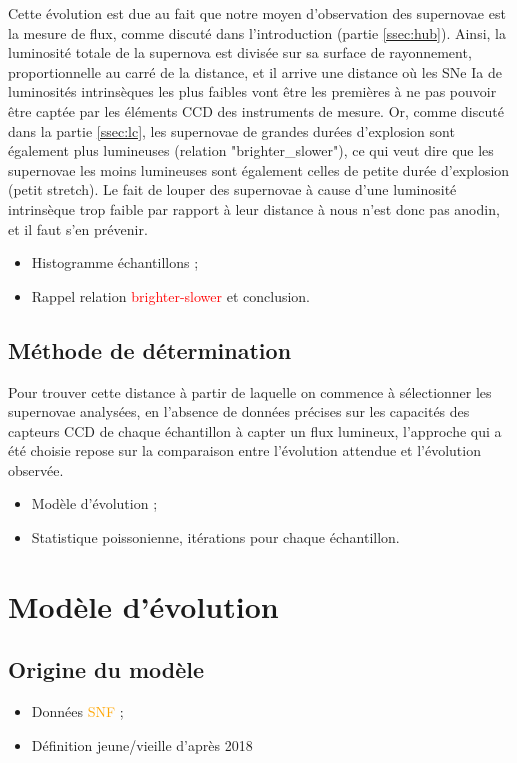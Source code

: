 \documentclass[a4paper, 12pt, svgnames]{article}
\begin{document}
Cette évolution est due au fait que notre moyen d'observation des supernovae est
la mesure de flux, comme discuté dans l'introduction (partie \ref{ssec:hub}).
Ainsi, la luminosité totale de la supernova est divisée sur sa surface de
rayonnement, proportionnelle au carré de la distance, et il arrive une distance
où les SNe Ia de luminosités intrinsèques les plus faibles vont être les
premières à ne pas pouvoir être captée par les éléments CCD des instruments de
mesure. Or, comme discuté dans la partie \ref{ssec:lc}, les supernovae de
grandes durées d'explosion sont également plus lumineuses (relation
"brighter_slower"), ce qui veut dire que les supernovae les moins lumineuses
sont également celles de petite durée d'explosion (petit stretch). Le fait de
louper des supernovae à cause d'une luminosité intrinsèque trop faible par
rapport à leur distance à nous n'est donc pas anodin, et il faut s'en prévenir.

\begin{itemize}
    \item Histogramme échantillons ;
    \item Rappel relation \textcolor{red}{brighter-slower} et conclusion.
\end{itemize}

\subsection{Méthode de détermination}\label{ssec:det}
Pour trouver cette distance à partir de laquelle on commence à sélectionner les
supernovae analysées, en l'absence de données précises sur les capacités des
capteurs CCD de chaque échantillon à capter un flux lumineux, l'approche qui a
été choisie repose sur la comparaison entre l'évolution attendue et l'évolution
observée.
\begin{itemize}
    \item Modèle d'évolution ;
    \item Statistique poissonienne, itérations pour chaque échantillon.
\end{itemize}

\section{Modèle d'évolution}
\subsection{Origine du modèle}
\begin{itemize}
    \item Données \textcolor{orange}{SNF} ;
    \item Définition jeune/vieille d'après  2018
\end{itemize}
\end{document}
